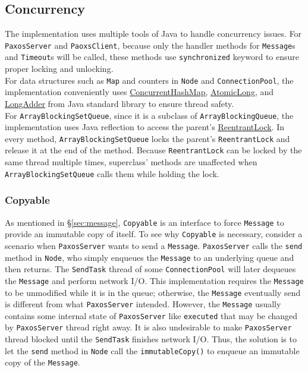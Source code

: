 \documentclass{article}
\numberwithin{equation}{section}
\begin{document}
\subsection{Concurrency}\label{sec:concurrency}
The implementation uses multiple tools of Java to handle concurrency issues. For \verb|PaxosServer| and \verb|PaoxsClient|, because only the handler methods for \verb|Message|s and \verb|Timeout|s will be called, these methods use \verb|synchronized| keyword to ensure proper locking and unlocking.\\

For data structures such as \verb|Map| and counters in \verb|Node| and \verb|ConnectionPool|, the implementation conveniently uses \href{https://docs.oracle.com/javase/8/docs/api/java/util/concurrent/ConcurrentHashMap.html}{ConcurrentHashMap}, \href{https://docs.oracle.com/javase/8/docs/api/java/util/concurrent/atomic/AtomicLong.html}{AtomicLong}, and \href{https://docs.oracle.com/javase/8/docs/api/java/util/concurrent/atomic/LongAdder.html}{LongAdder} from Java standard library to ensure thread safety.\\

For \verb|ArrayBlockingSetQueue|, since it is a subclass of \verb|ArrayBlockingQueue|, the implementation uses Java reflection to access the parent's \href{https://docs.oracle.com/javase/8/docs/api/java/util/concurrent/locks/ReentrantLock.html}{ReentrantLock}. In every method, \verb|ArrayBlockingSetQueue| locks the parent's \verb|ReentrantLock| and release it at the end of the method. Because \verb|ReentrantLock| can be locked by the same thread multiple times, superclass' methods are unaffected when \verb|ArrayBlockingSetQueue| calls them while holding the lock.

\subsubsection{Copyable}\label{sec:copyable}
As mentioned in \S\ref{sec:message}, \verb|Copyable| is an interface to force \verb|Message| to provide an immutable copy of itself. To see why \verb|Copyable| is necessary, consider a scenario when \verb|PaxosServer| wants to send a \verb|Message|. \verb|PaxosServer| calls the \verb|send| method in \verb|Node|, who simply enqueues the \verb|Message| to an underlying queue and then returns. The \verb|SendTask| thread of some \verb|ConnectionPool| will later dequeues the \verb|Message| and perform network I/O. This implementation requires the \verb|Message| to be unmodified while it is in the queue; otherwise, the \verb|Message| eventually send is different from what \verb|PaxosServer| intended. However, the \verb|Message| usually contains some internal state of \verb|PaxosServer| like \verb|executed| that may be changed by \verb|PaxosServer| thread right away. It is also undesirable to make \verb|PaxosServer| thread blocked until the \verb|SendTask| finishes network I/O. Thus, the solution is to let the \verb|send| method in \verb|Node| call the \verb|immutableCopy()| to enqueue an immutable copy of the \verb|Message|.
\end{document}

